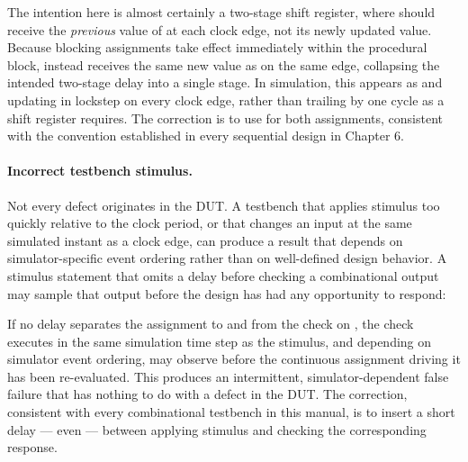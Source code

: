 The intention here is almost certainly a two-stage shift register, where  should receive the \emph{previous} value of  at each clock edge, not its newly updated value. Because blocking assignments take effect immediately within the procedural block,  instead receives the same new value as  on the same edge, collapsing the intended two-stage delay into a single stage. In simulation, this appears as  and  updating in lockstep on every clock edge, rather than  trailing  by one cycle as a shift register requires. The correction is to use \inlinecode{<=} for both assignments, consistent with the convention established in every sequential design in Chapter 6.\\

\paragraph{Incorrect testbench stimulus.} Not every defect originates in the DUT. A testbench that applies stimulus too quickly relative to the clock period, or that changes an input at the same simulated instant as a clock edge, can produce a result that depends on simulator-specific event ordering rather than on well-defined design behavior. A stimulus statement that omits a delay before checking a combinational output may sample that output before the design has had any opportunity to respond:


If no delay separates the assignment to  and  from the check on , the check executes in the same simulation time step as the stimulus, and depending on simulator event ordering, may observe  before the continuous assignment driving it has been re-evaluated. This produces an intermittent, simulator-dependent false failure that has nothing to do with a defect in the DUT. The correction, consistent with every combinational testbench in this manual, is to insert a short delay --- even  --- between applying stimulus and checking the corresponding response.\\

